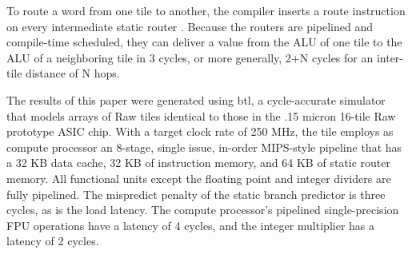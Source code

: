 To route a word from one tile to another, the compiler inserts a route
instruction on every intermediate static router \cite{lee98spacetime}.
Because the routers are pipelined and compile-time scheduled, they can
deliver a value from the ALU of one tile to the ALU of a neighboring
tile in 3 cycles, or more generally, 2+N cycles for an inter-tile
distance of N hops.

The results of this paper were generated using btl, a cycle-accurate
simulator that models arrays of Raw tiles identical to those in the
.15 micron 16-tile Raw prototype ASIC chip.  With a target clock rate
of 250 MHz, the tile employs as compute processor an 8-stage, single
issue, in-order MIPS-style pipeline that has a 32 KB data cache, 32 KB
of instruction memory, and 64 KB of static router memory. All
functional units except the floating point and integer dividers are
fully pipelined. The mispredict penalty of the static branch predictor
is three cycles, as is the load latency. The compute processor's
pipelined single-precision FPU operations have a latency of 4 cycles,
and the integer multiplier has a latency of 2 cycles.




